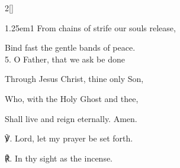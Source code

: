 \begin{paracol}{2}[]
\begin{hangparas}{1.25em}{1}
From chains of strife our souls release,

Bind fast the gentle bands of peace.\\

5. O Father, that we ask be done

Through Jesus Christ, thine only Son,

Who, with the Holy Ghost and thee,

Shall live and reign eternally. Amen.\\
\end{hangparas}

℣. Lord, let my prayer be set forth.

℟. In thy sight as the incense.


\fussy
\end{paracol}


